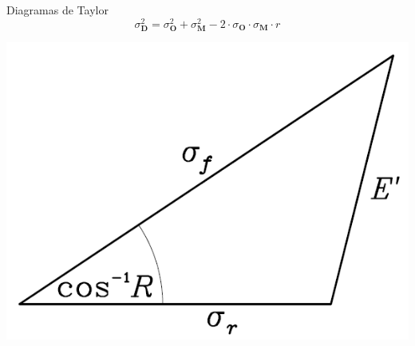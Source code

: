 \documentclass[xcolor={usenames,svgnames,dvipsnames}]{beamer}
\begin{document}
\begin{frame}[label={sec:org06c7800}]{Diagramas de Taylor}
\[
\sigma^2_{\mathbf{D}} = \sigma^2_{\mathbf{O}}  + \sigma^2_{\mathbf{M}}
- 2 \cdot \sigma_{\mathbf{O}} \cdot \sigma_{\mathbf{M}} \cdot r 
\]

\begin{center}
\begin{center}
\includegraphics[width=.9\linewidth]{../figs/cosenosDiagramaTaylor.png}
\end{center}
\end{center}
\end{frame}
\end{document}
